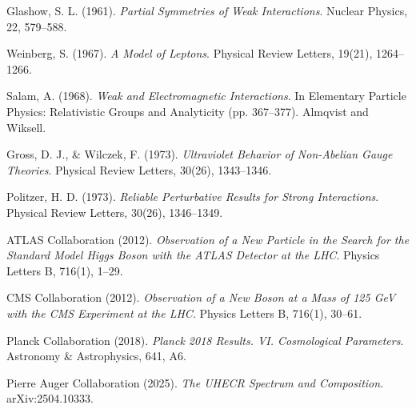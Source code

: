 \documentclass[%
 reprint,
 amsmath,amssymb,
 aps,
 pra,
 longbibliography,
 nofootinbib
]{revtex4-2}
\begin{document}
\begin{thebibliography}{99}
Glashow, S. L. (1961).
\textit{Partial Symmetries of Weak Interactions}.
Nuclear Physics, 22, 579–588.

Weinberg, S. (1967).
\textit{A Model of Leptons}.
Physical Review Letters, 19(21), 1264–1266.

Salam, A. (1968).
\textit{Weak and Electromagnetic Interactions}.
In Elementary Particle Physics: Relativistic Groups and Analyticity (pp. 367–377). Almqvist and Wiksell.

Gross, D. J., \& Wilczek, F. (1973).
\textit{Ultraviolet Behavior of Non-Abelian Gauge Theories}.
Physical Review Letters, 30(26), 1343–1346.

Politzer, H. D. (1973).
\textit{Reliable Perturbative Results for Strong Interactions}.
Physical Review Letters, 30(26), 1346–1349.

ATLAS Collaboration (2012).
\textit{Observation of a New Particle in the Search for the Standard Model Higgs Boson with the ATLAS Detector at the LHC}.
Physics Letters B, 716(1), 1–29.

CMS Collaboration (2012).
\textit{Observation of a New Boson at a Mass of 125 GeV with the CMS Experiment at the LHC}.
Physics Letters B, 716(1), 30–61.

Planck Collaboration (2018).
\textit{Planck 2018 Results. VI. Cosmological Parameters}.
Astronomy \& Astrophysics, 641, A6.

Pierre Auger Collaboration (2025).
\textit{The UHECR Spectrum and Composition}.
arXiv:2504.10333.
\end{thebibliography}
\end{document}
